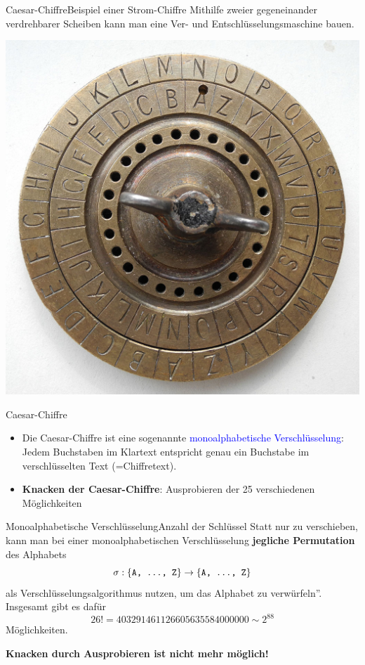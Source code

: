 \documentclass{beamer}
\newcommand{\tb}[1]{{\textcolor{blue}{#1}}}
\theoremstyle{plain}
\begin{document}
\begin{frame}{Caesar-Chiffre}{Beispiel einer Strom-Chiffre}
Mithilfe zweier gegeneinander verdrehbarer Scheiben kann man eine Ver- und Entschlüsselungsmaschine bauen. 

\vspace{0.5cm}
\begin{center}
\includegraphics[height=0.5\textheight]{caesar-chiffre}
\end{center}
\end{frame}

\begin{frame}{Caesar-Chiffre}{~}

\begin{itemize}
 \item Die Caesar-Chiffre ist eine sogenannte \tb{monoalphabetische Verschlüsselung}: Jedem Buchstaben im Klartext entspricht genau ein Buchstabe im verschlüsselten Text (=Chiffretext). 
 \item \textbf{Knacken der Caesar-Chiffre}: \pause Ausprobieren der 25 verschiedenen Möglichkeiten
\end{itemize}

\end{frame}

\begin{frame}{Monoalphabetische Verschlüsselung}{Anzahl der Schlüssel}
  Statt nur zu verschieben, kann man bei einer monoalphabetischen Verschlüsselung \textbf{jegliche Permutation} des Alphabets $$\sigma: \{\texttt{A, \dots, Z}\} \rightarrow \{\texttt{A, \dots, Z}\}$$
 als Verschlüsselungsalgorithmus nutzen, um das Alphabet zu \glqq verwürfeln''. \\
 Insgesamt gibt es dafür
 $$26! = 403 291 461 126 605 635 584 000 000 \sim 2^{88}$$
 Möglichkeiten. 
 \begin{center}
 \textbf{Knacken durch Ausprobieren ist nicht mehr möglich!}  
 \end{center}
\end{frame}
\end{document}
